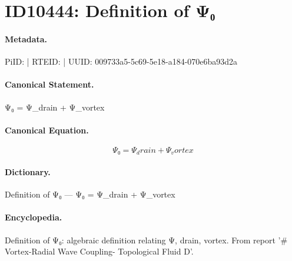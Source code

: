 \section*{ID10444: Definition of Ψ₀}
\paragraph{Metadata.}
PiID:  | RTEID:  | UUID: 009733a5-5c69-5e18-a184-070e6ba93d2a

\paragraph{Canonical Statement.}
Ψ₀ = Ψ\_drain + Ψ\_vortex

\paragraph{Canonical Equation.}
\[
Ψ₀ = Ψ_drain + Ψ_vortex
\]

\paragraph{Dictionary.}
Definition of Ψ₀ — Ψ₀ = Ψ\_drain + Ψ\_vortex

\paragraph{Encyclopedia.}
Definition of Ψ₀: algebraic definition relating Ψ, drain, vortex. From report '\# Vortex-Radial Wave Coupling- Topological Fluid D'.
